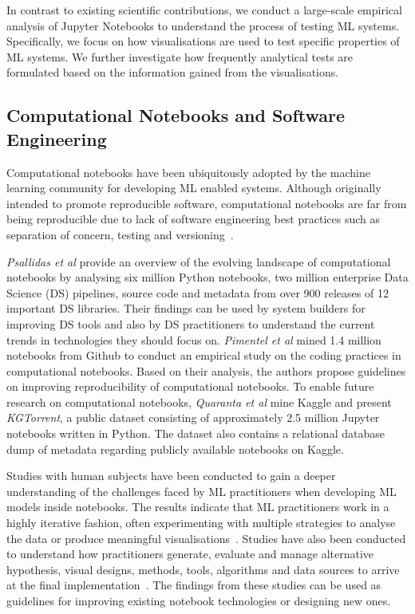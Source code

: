 In contrast to existing scientific contributions, we conduct a
large-scale empirical analysis of Jupyter Notebooks to understand the
process of testing ML systems. Specifically, we focus on how
visualisations are used to test specific properties of ML systems. We
further investigate how frequently analytical tests are formulated
based on the information gained from the visualisations.

\subsection{Computational Notebooks and Software Engineering}\label{sec:notebooks}

Computational notebooks have been ubiquitously adopted by the machine
learning community for developing ML enabled systems. Although
originally intended to promote reproducible software, computational
notebooks are far from being reproducible due to lack of software
engineering best practices such as separation of concern, testing and
versioning~\cite{pimentel2019large,wang2020better,chattopadhyay2020wrong}.

\emph{Psallidas et al} provide an overview of the evolving landscape
of computational notebooks by analysing six million Python notebooks,
two million enterprise Data Science (DS) pipelines, source code and
metadata from over 900 releases of 12 important DS libraries. Their
findings can be used by system builders for improving DS tools and
also by DS practitioners to understand the current trends in
technologies they should focus on. \emph{Pimentel et al} mined 1.4
million notebooks from Github to conduct an empirical study on the
coding practices in computational notebooks. Based on their analysis,
the authors propose guidelines on improving reproducibility of
computational notebooks. To enable future research on computational
notebooks, \emph{Quaranta et al} mine Kaggle and present
\textit{KGTorrent}, a public dataset consisting of approximately 2.5
million Jupyter notebooks written in Python. The dataset also contains
a relational database dump of metadata regarding publicly available
notebooks on Kaggle.

Studies with human subjects have been conducted to gain a deeper
understanding of the challenges faced by ML practitioners when
developing ML models inside notebooks. The results indicate that ML
practitioners work in a highly iterative fashion, often experimenting
with multiple strategies to analyse the data or produce meaningful
visualisations~\cite{kandel2012enterprise, kery2018story,
  liu2019understanding, chattopadhyay2020wrong}. Studies have also
been conducted to understand how practitioners generate, evaluate and
manage alternative hypothesis, visual designs, methods, tools,
algorithms and data sources to arrive at the final
implementation~\cite{liu2019understanding,kandel2012enterprise}. The
findings from these studies can be used as guidelines for improving
existing notebook technologies or designing new ones.

